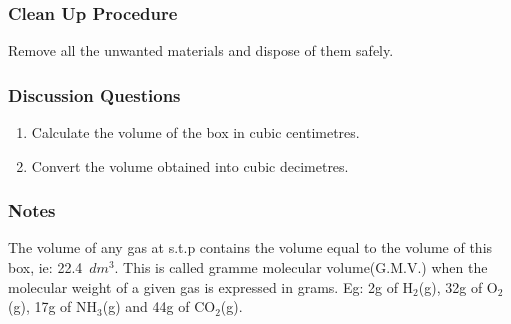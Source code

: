 \subsubsection*{Clean Up Procedure}
Remove all the unwanted materials and dispose of them safely.

\subsubsection*{Discussion Questions}
\begin{enumerate}
\item{Calculate the volume of the box in cubic centimetres.}
\item{Convert the volume obtained into cubic decimetres.}
\end{enumerate}

\subsubsection*{Notes}
The volume of any gas at s.t.p contains the volume equal to the volume of this box, ie: 22.4~$dm^{3}$. This is called gramme molecular volume(G.M.V.) when the molecular weight of a given gas is expressed in grams. Eg: 2g of H$_{2}$(g), 32g of O$_{2}$(g), 17g of NH$_{3}$(g) and 44g of CO$_{2}$(g).
